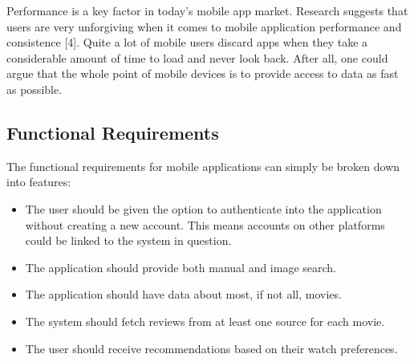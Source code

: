 \documentclass[12pt,a4paper,twoside]{report}
\begin{document}
Performance is a key factor in today's mobile app market. Research suggests that users are very unforgiving when it comes to mobile application performance and consistence [4]. Quite a lot of mobile users discard apps when they take a considerable amount of time to load and never look back. After all, one could argue that the whole point of mobile devices is to provide access to data as fast as possible.

\subsection{Functional Requirements}
\noindent The functional requirements for mobile applications can simply be broken down into features:
\begin{itemize}
    \item The user should be given the option to authenticate into the application without creating a new account. This means accounts on other platforms could be linked to the system in question.
    \item The application should provide both manual and image search.
    \item The application should have data about most, if not all, movies.
    \item The system should fetch reviews from at least one source for each movie.
    \item The user should receive recommendations based on their watch preferences.
\end{itemize}
\end{document}
